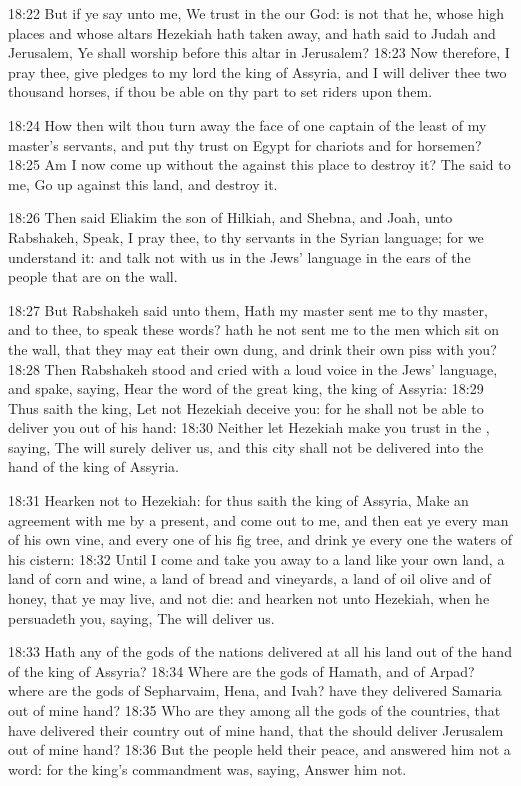 18:22 But if ye say unto me, We trust in the \LORD our God: is not that he, whose high places and whose altars Hezekiah hath taken away, and hath said to Judah and Jerusalem, Ye shall worship before this altar in Jerusalem?  18:23 Now therefore, I pray thee, give pledges to my lord the king of Assyria, and I will deliver thee two thousand horses, if thou be able on thy part to set riders upon them.

18:24 How then wilt thou turn away the face of one captain of the least of my master's servants, and put thy trust on Egypt for chariots and for horsemen?  18:25 Am I now come up without the \LORD against this place to destroy it?  The \LORD said to me, Go up against this land, and destroy it.

18:26 Then said Eliakim the son of Hilkiah, and Shebna, and Joah, unto Rabshakeh, Speak, I pray thee, to thy servants in the Syrian language; for we understand it: and talk not with us in the Jews' language in the ears of the people that are on the wall.

18:27 But Rabshakeh said unto them, Hath my master sent me to thy master, and to thee, to speak these words? hath he not sent me to the men which sit on the wall, that they may eat their own dung, and drink their own piss with you?  18:28 Then Rabshakeh stood and cried with a loud voice in the Jews' language, and spake, saying, Hear the word of the great king, the king of Assyria: 18:29 Thus saith the king, Let not Hezekiah deceive you: for he shall not be able to deliver you out of his hand: 18:30 Neither let Hezekiah make you trust in the \LORD, saying, The \LORD will surely deliver us, and this city shall not be delivered into the hand of the king of Assyria.

18:31 Hearken not to Hezekiah: for thus saith the king of Assyria, Make an agreement with me by a present, and come out to me, and then eat ye every man of his own vine, and every one of his fig tree, and drink ye every one the waters of his cistern: 18:32 Until I come and take you away to a land like your own land, a land of corn and wine, a land of bread and vineyards, a land of oil olive and of honey, that ye may live, and not die: and hearken not unto Hezekiah, when he persuadeth you, saying, The \LORD will deliver us.

18:33 Hath any of the gods of the nations delivered at all his land out of the hand of the king of Assyria?  18:34 Where are the gods of Hamath, and of Arpad? where are the gods of Sepharvaim, Hena, and Ivah? have they delivered Samaria out of mine hand?  18:35 Who are they among all the gods of the countries, that have delivered their country out of mine hand, that the \LORD should deliver Jerusalem out of mine hand?  18:36 But the people held their peace, and answered him not a word: for the king's commandment was, saying, Answer him not.

